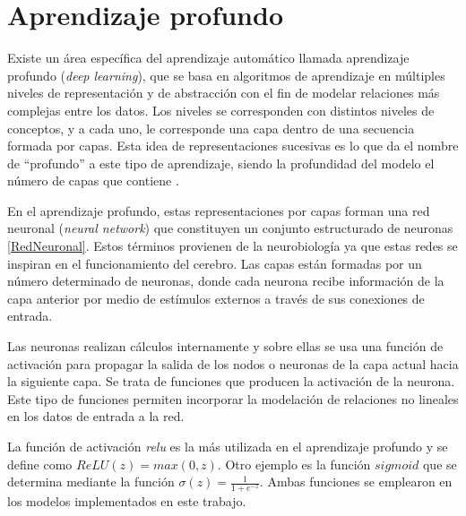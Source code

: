   
 \section{Aprendizaje profundo}\label{1-DeepLearn}
 
 Existe un área específica del aprendizaje automático llamada aprendizaje profundo (\textit{deep learning}), que se basa en algoritmos de aprendizaje en múltiples niveles de representación y de abstracción con el fin de modelar relaciones más complejas entre los datos. Los niveles se corresponden con distintos niveles de conceptos, y a cada uno, le corresponde una capa dentro de una secuencia formada por capas. Esta idea de representaciones sucesivas es lo que da el nombre de “profundo” a este tipo de aprendizaje, siendo la profundidad del modelo el número de capas que contiene \cite{deng2014deep}.
 
 En el aprendizaje profundo, estas representaciones por capas forman una red neuronal (\textit{neural network}) que constituyen un conjunto estructurado de neuronas \ref{RedNeuronal}. Estos términos provienen de la neurobiología ya que estas redes se inspiran en el funcionamiento del cerebro. Las capas están formadas por un número determinado de neuronas, donde cada neurona recibe información de la capa anterior por medio de estímulos externos a través de sus conexiones de entrada. 
 
 Las neuronas realizan cálculos internamente y sobre ellas se usa una función de activación para propagar la salida de los nodos o neuronas de la capa actual hacia la siguiente capa. Se trata de funciones que producen la activación de la neurona. Este tipo de funciones permiten incorporar la modelación de relaciones no lineales en los datos de entrada a la red.
 
 La función de activación \textit{relu} es la más utilizada en el aprendizaje profundo \cite{Chollet} y se define como $ReLU(z) = max(0, z)$. Otro ejemplo es la función $sigmoid$ que se determina mediante la función $\sigma(z) = \frac{1}{1 + e^{-z}}$. Ambas funciones se emplearon en los modelos implementados en este trabajo.
 
 
 
 
